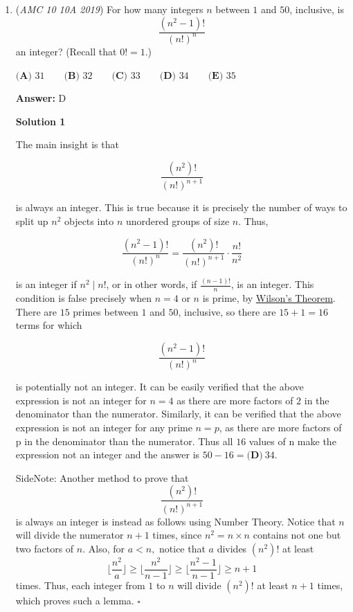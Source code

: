 \begin{enumerate}
	\item (\textit{AMC 10 10A 2019}) For how many integers $n$ between $1$ and $50$, inclusive, is 
 \[\frac{(n^2-1)!}{(n!)^{n}}\] an integer? (Recall that $0!=1$.)


 $\textbf{(A) } 31 \qquad \textbf{(B) } 32 \qquad \textbf{(C) } 33 \qquad \textbf{(D) } 34 \qquad \textbf{(E) } 35$

 \textbf{Answer: }D



\textbf{Solution 1}

The main insight is that 

 
 \[\frac{(n^2)!}{(n!)^{n+1}}\] 

 is always an integer. This is true because it is precisely the number of ways to split up $n^2$ objects into $n$ unordered groups of size $n$. Thus,

 
 \[\frac{(n^2-1)!}{(n!)^n}=\frac{(n^2)!}{(n!)^{n+1}}\cdot\frac{n!}{n^2}\]

 is an integer if $n^2 \mid n!$, or in other words, if $\frac{(n-1)!}{n}$, is an integer. This condition is false precisely when $n=4$ or $n$ is prime, by \href{https://artofproblemsolving.com/wiki/index.php?title=Wilson\%27s\_Theorem}{Wilson's Theorem}. There are $15$ primes between $1$ and $50$, inclusive, so there are $15 + 1 = 16$ terms for which

 
 \[\frac{(n^2-1)!}{(n!)^{n}}\]

 is potentially not an integer. It can be easily verified that the above expression is not an integer for $n=4$ as there are more factors of $2$ in the denominator than the numerator. Similarly, it can be verified that the above expression is not an integer for any prime $n=p$, as there are more factors of p in the denominator than the numerator. Thus all $16$ values of n make the expression not an integer and the answer is $50-16=\boxed{\textbf{(D)}\ 34}$.

 SideNote: Another method to prove that 
 \[\frac{(n^2)!}{(n!)^{n+1}}\] is always an integer is instead as follows using Number Theory. Notice that $n$ will divide the numerator $n+1$ times, since $n^2 = n \times n$ contains not one but two factors of $n.$ Also, for $a < n,$ notice that $a$ divides $(n^2)!$ at least 
 \[\lfloor \frac{n^2}{a} \rfloor \ge \lfloor \frac{n^2}{n-1} \rfloor \ge \lfloor \frac{n^2 - 1}{n-1} \rfloor \ge n+1\] times. Thus, each integer from $1$ to $n$ will divide $(n^2)!$ at least $n+1$ times, which proves such a lemma. $\square{}$





\end{enumerate}
